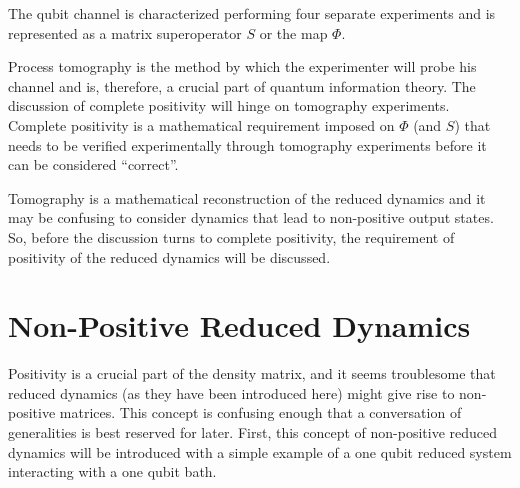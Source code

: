 The qubit channel is characterized performing four separate experiments and is represented as a matrix superoperator $S$ or the map $\Phi$.     

Process tomography is the method by which the experimenter will probe his channel and is, therefore, a crucial part of quantum information theory.  The discussion of complete positivity will hinge on tomography experiments.  Complete positivity is a mathematical requirement imposed on $\Phi$ (and $S$) that needs to be verified experimentally through tomography experiments before it can be considered ``correct''.  

Tomography is a mathematical reconstruction of the reduced dynamics and it may be confusing to consider dynamics that lead to non-positive output states. So, before the discussion turns to complete positivity, the requirement of positivity of the reduced dynamics will be discussed. 

\chapter{Non-Positive Reduced Dynamics}
\label{sec:posdomain}

Positivity is a crucial part of the density matrix, and it seems troublesome that reduced dynamics (as they have been introduced here) might give rise to non-positive matrices.  This concept is confusing enough that a conversation of generalities is best reserved for later.  First, this concept of non-positive reduced dynamics will be introduced with a simple example of a one qubit reduced system interacting with a one qubit bath.

